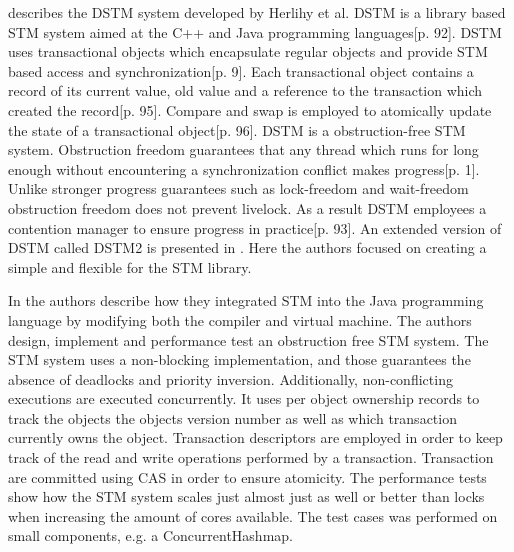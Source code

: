 \cite{herlihy2003software} describes the DSTM system developed by Herlihy et al. DSTM is a library based \ac{STM} system aimed at the C++ and Java programming languages\cite{herlihy2003software}[p. 92]. DSTM uses transactional objects which encapsulate regular objects and provide \ac{STM} based access and synchronization\cite{herlihy2003software}[p. 9]. Each transactional object contains a record of its current value, old value and a reference to the transaction which created the record\cite{herlihy2003software}[p. 95]. Compare and swap is employed to atomically update the state of a transactional object\cite{herlihy2003software}[p. 96]. DSTM is a obstruction-free\cite{herlihy2003obstruction} \ac{STM} system. Obstruction freedom guarantees that any thread which runs for long enough without encountering a synchronization conflict makes progress\cite{herlihy2003obstruction}[p. 1]. Unlike stronger progress guarantees such as lock-freedom and wait-freedom obstruction freedom does not prevent livelock. As a result DSTM employees a contention manager to ensure progress in practice\cite{herlihy2003software}[p. 93]. An extended version of DSTM called DSTM2 is presented in \cite{herlihy2006flexible}. Here the authors focused on creating a simple and flexible  for the \ac{STM} library.

In \cite{harris2003language} the authors describe how they integrated \ac{STM} into the Java programming language by modifying both the compiler\cite[p. 4]{harris2003language} and virtual machine\cite[p. 9]{harris2003language}. The authors design, implement and performance test an obstruction free \ac{STM} system. The \ac{STM} system uses a non-blocking implementation, and those guarantees the absence of deadlocks and priority inversion. Additionally, non-conflicting executions are executed concurrently. It uses per object ownership records to track the objects the objects version number as well as which transaction currently owns the object\cite[p. 6]{harris2003language}. Transaction descriptors are employed in order to keep track of the read and write operations performed by a transaction. Transaction are committed  using \ac{CAS} in order to ensure atomicity\cite[p. 7]{harris2003language}. The performance tests show how the \ac{STM} system scales just almost just as well or better than locks when increasing the amount of cores available\cite[p. 12]{harris2003language}. The test cases was performed on small components, e.g. a ConcurrentHashmap.

